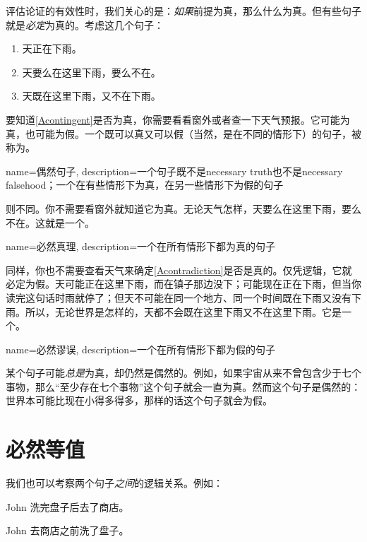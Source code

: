 评估论证的有效性时，我们关心的是：\emph{如果}前提为真，那么什么为真。但有些句子就是\emph{必定}为真的。考虑这几个句子：


\begin{enumerate}
		\item\label{Acontingent} 天正在下雨。
		\item\label{Atautology} 天要么在这里下雨，要么不在。
		\item\label{Acontradiction} 天既在这里下雨，又不在下雨。
	\end{enumerate}


要知道\cref*{Acontingent}是否为真，你需要看看窗外或者查一下天气预报。它可能为真，也可能为假。一个既可以真又可以假（当然，是在不同的情形下）的句子，被称为。

{
name={偶然句子},
description={一个句子既不是\gls{necessary truth}也不是\gls{necessary falsehood}；一个在有些情形下为真，在另一些情形下为假的句子}
}

则不同。你不需要看窗外就知道它为真。无论天气怎样，天要么在这里下雨，要么不在。这就是一个。

{
name={必然真理},
description={一个在所有情形下都为真的句子}
}

同样，你也不需要查看天气来确定\cref*{Acontradiction}是否是真的。仅凭逻辑，它就必定为假。天可能正在这里下雨，而在镇子那边没下；可能现在正在下雨，但当你读完这句话时雨就停了；但天不可能在同一个地方、同一个时间既在下雨又没有下雨。所以，无论世界是怎样的，天都不会既在这里下雨又不在这里下雨。它是一个。

{
name={必然谬误},
description={一个在所有情形下都为假的句子}
}

某个句子可能\emph{总是}为真，却仍然是偶然的。例如，如果宇宙从来不曾包含少于七个事物，那么“至少存在七个事物”这个句子就会一直为真。然而这个句子是偶然的：世界本可能比现在小得多得多，那样的话这个句子就会为假。

\section{必然等值}

我们也可以考察两个句子\emph{之间}的逻辑关系。例如：


\begin{compactlist}
\item[] John 洗完盘子后去了商店。
\item[] John 去商店之前洗了盘子。
\end{compactlist}


